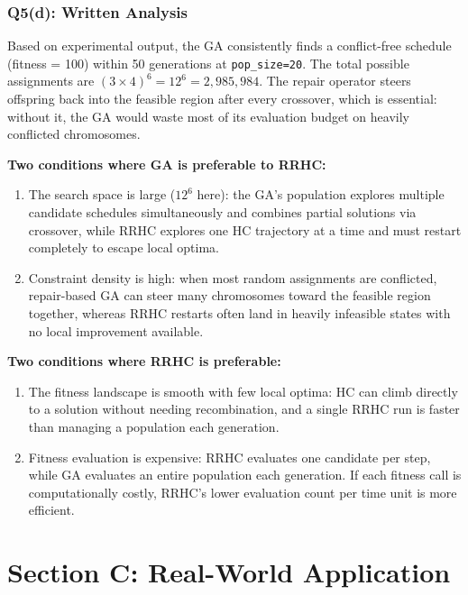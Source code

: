 \documentclass[12pt,a4paper]{article}
\begin{document}
\subsubsection*{Q5(d): Written Analysis}

Based on experimental output, the GA consistently finds a conflict-free schedule
(fitness = 100) within 50 generations at \texttt{pop\_size=20}.
The total possible assignments are $(3 \times 4)^6 = 12^6 = 2{,}985{,}984$.
The repair operator steers offspring back into the feasible region after every
crossover, which is essential: without it, the GA would waste most of its
evaluation budget on heavily conflicted chromosomes.

\textbf{Two conditions where GA is preferable to RRHC:}
\begin{enumerate}
  \item The search space is large ($12^6$ here): the GA's population explores
        multiple candidate schedules simultaneously and combines partial solutions
        via crossover, while RRHC explores one HC trajectory at a time and must
        restart completely to escape local optima.
  \item Constraint density is high: when most random assignments are conflicted,
        repair-based GA can steer many chromosomes toward the feasible region
        together, whereas RRHC restarts often land in heavily infeasible states
        with no local improvement available.
\end{enumerate}

\textbf{Two conditions where RRHC is preferable:}
\begin{enumerate}
  \item The fitness landscape is smooth with few local optima: HC can climb
        directly to a solution without needing recombination, and a single RRHC
        run is faster than managing a population each generation.
  \item Fitness evaluation is expensive: RRHC evaluates one candidate per step,
        while GA evaluates an entire population each generation. If each fitness
        call is computationally costly, RRHC's lower evaluation count per time
        unit is more efficient.
\end{enumerate}

\newpage
\section{Section C: Real-World Application}
\end{document}
